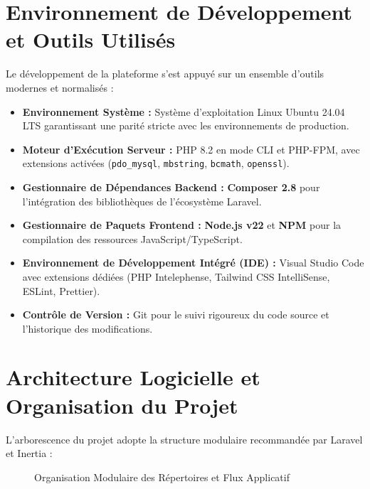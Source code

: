 \documentclass{bts-report}
\begin{document}
\section{Environnement de D\'eveloppement et Outils Utilis\'es}
Le d\'eveloppement de la plateforme s'est appuy\'e sur un ensemble d'outils modernes et normalis\'es :
\begin{itemize}
  \item \textbf{Environnement Syst\`eme :} Syst\`eme d'exploitation Linux Ubuntu 24.04 LTS garantissant une parit\'e stricte avec les environnements de production.
  \item \textbf{Moteur d'Ex\'ecution Serveur :} PHP 8.2 en mode CLI et PHP-FPM, avec extensions activ\'ees (\texttt{pdo\_mysql}, \texttt{mbstring}, \texttt{bcmath}, \texttt{openssl}).
  \item \textbf{Gestionnaire de D\'ependances Backend :} \textbf{Composer 2.8} pour l'int\'egration des biblioth\`eques de l'\'ecosyst\`eme Laravel.
  \item \textbf{Gestionnaire de Paquets Frontend :} \textbf{Node.js v22} et \textbf{NPM} pour la compilation des ressources JavaScript/TypeScript.
  \item \textbf{Environnement de D\'eveloppement Int\'egr\'e (IDE) :} Visual Studio Code avec extensions d\'edi\'ees (PHP Intelephense, Tailwind CSS IntelliSense, ESLint, Prettier).
  \item \textbf{Contr\^ole de Version :} Git pour le suivi rigoureux du code source et l'historique des modifications.
\end{itemize}

\section{Architecture Logicielle et Organisation du Projet}
L'arborescence du projet adopte la structure modulaire recommand\'ee par Laravel et Inertia :

\begin{figure}[H]
  \centering
  
  \caption{Organisation Modulaire des R\'epertoires et Flux Applicatif}
  \label{fig:app-structure}
\end{figure}
\end{document}
